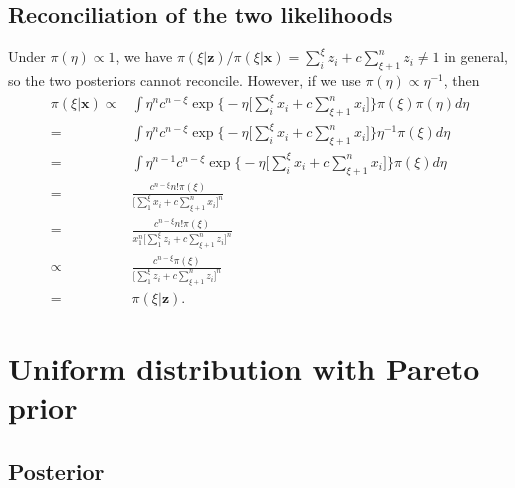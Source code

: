 \documentclass[12pt]{article}
\begin{document}
\subsection{Reconciliation of the two likelihoods}
Under $\pi(\eta) \propto 1$,
we have
$\pi(\xi|\bm{z}) / \pi(\xi | \bm{x}) = \sum_i^\xi z_i + c \sum_{\xi+1}^n z_i \neq 1$
in general,
so the two posteriors cannot reconcile.
However, if we use $\pi(\eta) \propto \eta^{-1}$,
then
\begin{align*}
  \pi(\xi|\bm{x})
  \propto & \int \eta^n c^{n - \xi} \exp\Big\{ -\eta\Big[\sum_i^\xi x_i + c \sum_{\xi+1}^n x_i\Big]\Big\} \pi(\xi) \pi(\eta) d\eta \\
  = & \int \eta^n c^{n - \xi} \exp\Big\{ -\eta\Big[\sum_i^\xi x_i + c \sum_{\xi+1}^n x_i\Big]\Big\} \eta^{-1} \pi(\xi) d\eta \\
  = & \int \eta^{n-1} c^{n - \xi} \exp\Big\{ -\eta\Big[\sum_i^\xi x_i + c \sum_{\xi+1}^n x_i\Big]\Big\} \pi(\xi) d\eta \\
  = & \frac{c^{n-\xi} n! \pi(\xi)}{\Big[\sum_1^\xi x_i + c\sum_{\xi+1}^n x_i\Big]^{n}}  \\ 
  = & \frac{c^{n-\xi} n! \pi(\xi)}{x_1^n \Big[\sum_1^\xi z_i + c\sum_{\xi+1}^n z_i\Big]^{n}} \\
  \propto & \frac{c^{n-\xi} \pi(\xi)}{\Big[\sum_1^\xi z_i + c\sum_{\xi+1}^n z_i\Big]^{n}} \\
  = & \pi(\xi|\bm{z}).
\end{align*}

\section{Uniform distribution with Pareto prior}

\subsection{Posterior}
\end{document}
